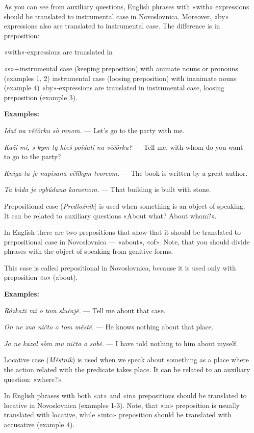 As you can see from auxiliary questions, English phrases with «with» expressions should be translated to instrumental case in Novoslovnica. Moreover, «by» expressions also are translated to instrumental case. The difference is in preposition:

«with»-expressions are translated in

«s»+instrumental case (keeping preposition) with animate nouns or pronouns (examples 1, 2)
instrumental case (loosing preposition) with inanimate nouns (example 4)
«by»-expressions are translated in instrumental case, loosing preposition (example 3).

\textbf{Examples:}

\textit{Idaǐ na věčôrku sò mnom.} — Let's go to the party with me.

\textit{Kaži mi, s kym ty hteš poǐdati na věčôrku?} — Tell me, with whom do you want to go to the party?

\textit{Kniga-ta je napisana vëlïkym tvorcom.} — The book is written by a great author.

\textit{Ta búda je vybúdana kamenom.} — That building is built with stone.

Prepositional case (\textit{Predložnik}) is used when something is an object of speaking. It can be related to auxiliary questions «About what? About whom?».

In English there are two prepositions that show that it should be translated to prepositional case in Novoslovnica — «about», «of». Note, that you should divide phrases with the object of speaking from genitive forms.

This case is called prepositional in Novoslovnica, because it is used only with preposition «o» (about).

\textbf{Examples:}

\textit{Råzkaži mi o tom slučajě.} — Tell me about that case.

\textit{On ne zna ničto o tom městě.} — He knows nothing about that place.

\textit{Ja ne kazal sòm mu ničto o sobě.} — I have told nothing to him about myself.

Locative case (\textit{Městnik}) is used when we speak about something as a place where the action related with the predicate takes place. It can be related to an auxiliary question: «where?».

In English phrases with both «at» and «in» prepositions should be translated to locative in Novoslovnica (examples 1-3). Note, that «in» preposition is usually translated with locative, while «into» preposition should be translated with accusative (example 4).

